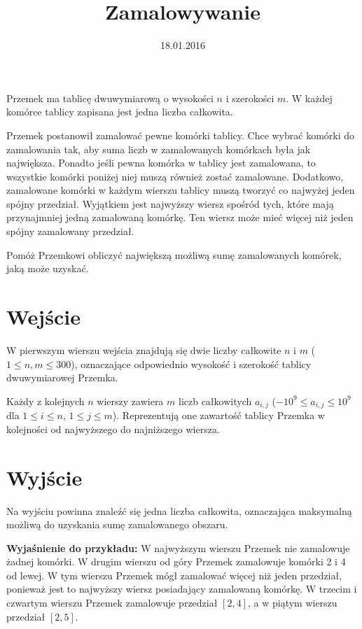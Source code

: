 \documentclass[zad,zawodnik,utf8]{sinol}
\title{Zamalowywanie}
\author{} %
\date{18.01.2016}
\begin{document}
\begin{tasktext}%
Przemek ma tablicę dwuwymiarową o wysokości $n$ i szerokości $m$. W każdej komórce tablicy zapisana jest jedna liczba całkowita.

Przemek postanowił zamalować pewne komórki tablicy. Chce wybrać komórki do zamalowania tak, aby suma liczb w zamalowanych komórkach była jak największa. Ponadto jeśli pewna komórka w tablicy jest zamalowana, to wszystkie komórki poniżej niej muszą również zostać zamalowane. Dodatkowo, zamalowane komórki w każdym wierszu tablicy muszą tworzyć co najwyżej jeden spójny przedział. Wyjątkiem jest najwyższy wiersz spośród tych, które mają przynajmniej jedną zamalowaną komórkę. Ten wiersz może mieć więcej niż jeden spójny zamalowany przedział.

Pomóż Przemkowi obliczyć największą możliwą sumę zamalowanych komórek, jaką może uzyskać.

  \section{Wejście}
W pierwszym wierszu wejścia znajdują się dwie liczby całkowite $n$ i $m$ ($1 \leq n,m \leq 300$), oznaczające odpowiednio wysokość i szerokość tablicy dwuwymiarowej Przemka.

Każdy z kolejnych $n$ wierszy zawiera $m$ liczb całkowitych $a_{i,j}$ ($-10^9 \leq a_{i,j} \leq 10^9$ dla $1 \leq i \leq n$, $1 \leq j \leq m$). Reprezentują one zawartość tablicy Przemka w kolejności od najwyższego do najniższego wiersza.

  \section{Wyjście}
Na wyjściu powinna znaleźć się jedna liczba całkowita, oznaczająca maksymalną możliwą do uzyskania sumę zamalowanego obszaru.

\makecompactexample

\medskip
\noindent
\textbf{Wyjaśnienie do przykładu:}
W najwyższym wierszu Przemek nie zamalowuje żadnej komórki. W drugim wierszu od góry Przemek zamalowuje komórki 2 i 4 od lewej. W tym wierszu Przemek mógł zamalować więcej niż jeden przedział, ponieważ jest to najwyższy wiersz posiadający zamalowaną komórkę. W trzecim i czwartym wierszu Przemek zamalowuje przedział $[2,4]$, a w piątym wierszu przedział $[2,5]$.

\end{tasktext}
\end{document}
